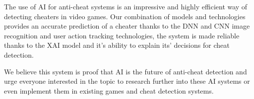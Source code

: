 The use of AI for anti-cheat systems is an impressive and highly efficient way of detecting cheaters in video games. Our combination of models and technologies provides an accurate prediction of a cheater thanks to the DNN and CNN image recognition and user action tracking technologies, the system is made reliable thanks to the XAI model and it's ability to explain its' decisions for cheat detection.

We believe this system is proof that AI is the future of anti-cheat detection and urge everyone interested in the topic to research further into these AI systems or even implement them in existing games and cheat detection systems.